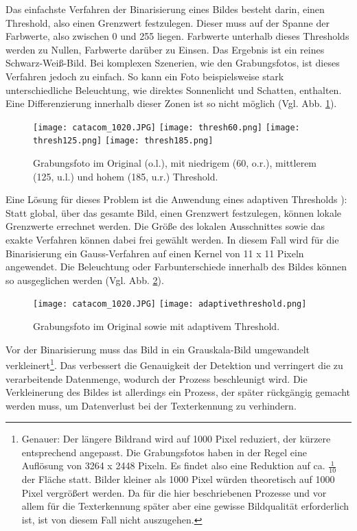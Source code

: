 Das einfachste Verfahren der Binarisierung eines Bildes besteht darin, einen Threshold, also einen Grenzwert festzulegen. Dieser muss auf der Spanne der Farbwerte, also zwischen 0 und 255 liegen.  Farbwerte unterhalb dieses Thresholds werden zu Nullen, Farbwerte darüber zu Einsen. Das Ergebnis ist ein reines Schwarz-Weiß-Bild. Bei komplexen Szenerien, wie den Grabungsfotos, ist dieses Verfahren jedoch zu einfach. So kann ein Foto beispielsweise stark unterschiedliche Beleuchtung, wie direktes Sonnenlicht und Schatten, enthalten. Eine Differenzierung innerhalb dieser Zonen ist so nicht möglich (Vgl. Abb. \ref{fig:threshold}).\\
\begin{figure}[h!]
\texttt{[image: catacom\_1020.JPG]}
\texttt{[image: thresh60.png]}
\texttt{[image: thresh125.png]}
\texttt{[image: thresh185.png]}
\caption{Grabungsfoto im Original (o.l.), mit niedrigem (60, o.r.), mittlerem (125, u.l.) und hohem (185, u.r.) Threshold.}
\label{fig:threshold}
\end{figure}
Eine Lösung für dieses Problem ist die Anwendung eines adaptiven Thresholds \cite{opencvadaptivethresholdopencvadaptivethreshold}): Statt global, über das gesamte Bild, einen Grenzwert festzulegen, können lokale Grenzwerte errechnet werden. Die Größe des lokalen Ausschnittes sowie das exakte Verfahren können dabei frei gewählt werden. In diesem Fall wird für die Binarisierung ein Gauss-Verfahren auf einen Kernel von 11 x 11 Pixeln angewendet. Die Beleuchtung oder Farbunterschiede innerhalb des Bildes können so ausgeglichen werden (Vgl. Abb. \ref{fig:adaptivethreshold}).
\begin{figure}[h!]
\texttt{[image: catacom\_1020.JPG]}
\texttt{[image: adaptivethreshold.png]}
\caption{Grabungsfoto im Original sowie mit adaptivem Threshold.}
\label{fig:adaptivethreshold}
\end{figure}
Vor der Binarisierung muss das Bild in ein Grauskala-Bild umgewandelt verkleinert\footnote{Genauer: Der längere Bildrand wird auf 1000 Pixel reduziert, der kürzere entsprechend angepasst. Die Grabungsfotos haben in der Regel eine Auflösung von 3264 x 2448 Pixeln. Es findet also eine Reduktion auf ca. $\frac{1}{10}$ der Fläche statt. Bilder kleiner als 1000 Pixel würden theoretisch auf 1000 Pixel vergrößert werden. Da für die hier beschriebenen Prozesse und vor allem für die Texterkennung später aber eine gewisse Bildqualität erforderlich ist, ist von diesem Fall nicht auszugehen.}. Das verbessert die Genauigkeit der Detektion und verringert die zu verarbeitende Datenmenge, wodurch der Prozess beschleunigt wird. Die Verkleinerung des Bildes ist allerdings ein Prozess, der später rückgängig gemacht werden muss, um Datenverlust bei der Texterkennung zu verhindern.

